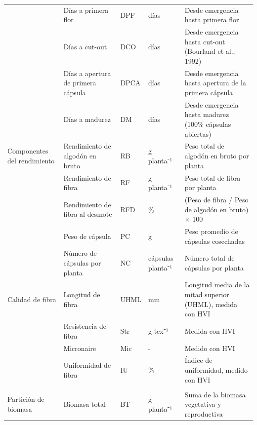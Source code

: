 \documentclass[12pt,oneside]{reedthesis}
\begin{document}
\begin{landscape}
\begin{table}[!h]
\begin{tabular}[t]{>{\raggedright\arraybackslash}p{5.3cm}>{\raggedright\arraybackslash}p{5.5cm}>{\raggedright\arraybackslash}p{1.0cm}>{\raggedright\arraybackslash}p{2.0cm}>{\raggedright\arraybackslash}p{8.8cm}}
\hspace{1em} & Días a primera flor & DPF & días & Desde emergencia hasta primera flor\\
\hspace{1em} & Días a cut-out & DCO & días & Desde emergencia hasta cut-out (Bourland et al., 1992)\\
\hspace{1em} & Días a apertura de primera cápsula & DPCA & días & Desde emergencia hasta apertura de la primera cápsula\\
\hspace{1em} & Días a madurez & DM & días & Desde emergencia hasta madurez (100\% cápsulas abiertas)\\
\hspace{1em}Componentes del rendimiento & Rendimiento de algodón en bruto & RB & g planta⁻¹ & Peso total de algodón en bruto por planta\\
\hspace{1em} & Rendimiento de fibra & RF & g planta⁻¹ & Peso total de fibra por planta\\
\hspace{1em} & Rendimiento de fibra al desmote & RFD & \% & (Peso de fibra / Peso de algodón en bruto) × 100\\
\hspace{1em} & Peso de cápsula & PC & g & Peso promedio de cápsulas cosechadas\\
\hspace{1em} & Número de cápsulas por planta & NC & cápsulas planta⁻¹ & Número total de cápsulas por planta\\
\hspace{1em}Calidad de fibra & Longitud de fibra & UHML & mm & Longitud media de la mitad superior (UHML), medida con HVI\\
\hspace{1em} & Resistencia de fibra & Str & g tex⁻¹ & Medida con HVI\\
\hspace{1em} & Micronaire & Mic & - & Medido con HVI\\
\hspace{1em} & Uniformidad de fibra & IU & \% & Índice de uniformidad, medido con HVI\\
\addlinespace[0.3em]
\multicolumn{5}{l}{\textbf{Caracteres evaluados en 8 entradas seleccionadas}}\\
\hline
\hspace{1em}Partición de biomasa & Biomasa total & BT & g planta⁻¹ & Suma de la biomasa vegetativa y reproductiva\\

\end{tabular}
\end{table}
\end{landscape}
\end{document}

